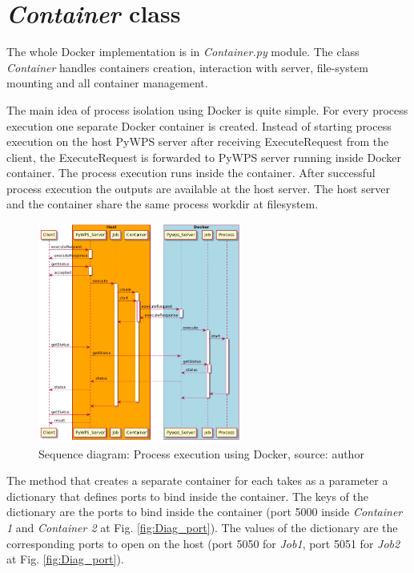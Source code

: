 \documentclass{gifce}
\begin{document}
\section{\textit{Container} class}
The whole Docker implementation is in \textit{Container.py} module. The class \textit{Container} handles containers creation, interaction with server, file-system mounting and all container management.

The main idea of process isolation using Docker is quite simple. For every process execution one separate Docker container is created.
Instead of starting process execution on the host PyWPS server after receiving ExecuteRequest from the client, the ExecuteRequest is
forwarded to PyWPS server running inside Docker container. The process execution runs inside the container. After successful process
execution the outputs are available at the host server. The host server and the container share the same process workdir at filesystem.

\begin{figure}[h!]
\centering
\includegraphics[width=0.6\textwidth]{img/Diag_sequence.png}
\caption{Sequence diagram: Process execution using Docker, source: author}
\label{fig:Diag_sequence}
\end{figure}

The method that creates a separate container for each takes as a parameter a dictionary
that defines ports to bind inside the container. The keys of the
dictionary are the ports to bind inside the container (port 5000
inside \textit{Container 1} and \textit{Container 2} at
Fig. \ref{fig:Diag_port}). The values of the dictionary are the
corresponding ports to open on the host (port 5050 for \textit{Job1},
port 5051 for \textit{Job2} at Fig. \ref{fig:Diag_port}).
\end{document}
